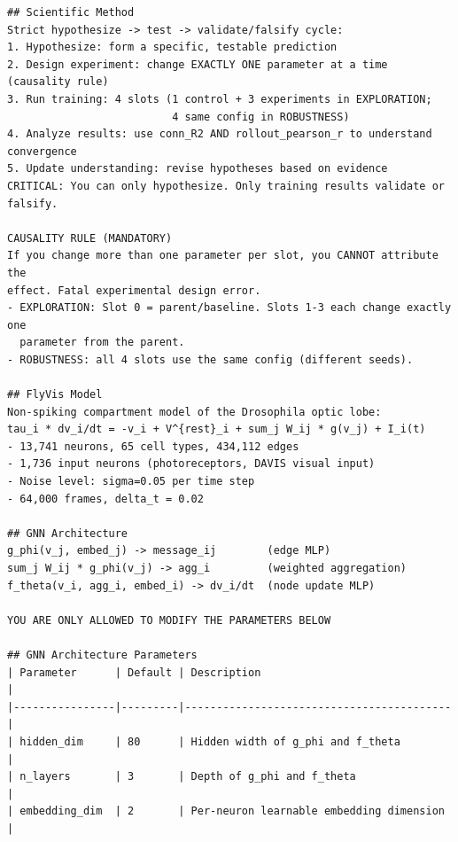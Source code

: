 \documentclass{article}
\begin{document}
\begin{tiny}
\begin{verbatim}
## Scientific Method
Strict hypothesize -> test -> validate/falsify cycle:
1. Hypothesize: form a specific, testable prediction
2. Design experiment: change EXACTLY ONE parameter at a time (causality rule)
3. Run training: 4 slots (1 control + 3 experiments in EXPLORATION;
                          4 same config in ROBUSTNESS)
4. Analyze results: use conn_R2 AND rollout_pearson_r to understand convergence
5. Update understanding: revise hypotheses based on evidence
CRITICAL: You can only hypothesize. Only training results validate or falsify.

CAUSALITY RULE (MANDATORY)
If you change more than one parameter per slot, you CANNOT attribute the
effect. Fatal experimental design error.
- EXPLORATION: Slot 0 = parent/baseline. Slots 1-3 each change exactly one
  parameter from the parent.
- ROBUSTNESS: all 4 slots use the same config (different seeds).

## FlyVis Model
Non-spiking compartment model of the Drosophila optic lobe:
tau_i * dv_i/dt = -v_i + V^{rest}_i + sum_j W_ij * g(v_j) + I_i(t)
- 13,741 neurons, 65 cell types, 434,112 edges
- 1,736 input neurons (photoreceptors, DAVIS visual input)
- Noise level: sigma=0.05 per time step
- 64,000 frames, delta_t = 0.02

## GNN Architecture
g_phi(v_j, embed_j) -> message_ij        (edge MLP)
sum_j W_ij * g_phi(v_j) -> agg_i         (weighted aggregation)
f_theta(v_i, agg_i, embed_i) -> dv_i/dt  (node update MLP)

YOU ARE ONLY ALLOWED TO MODIFY THE PARAMETERS BELOW

## GNN Architecture Parameters
| Parameter      | Default | Description                              |
|----------------|---------|------------------------------------------|
| hidden_dim     | 80      | Hidden width of g_phi and f_theta        |
| n_layers       | 3       | Depth of g_phi and f_theta               |
| embedding_dim  | 2       | Per-neuron learnable embedding dimension |


\end{verbatim}
\end{tiny}
\end{document}
